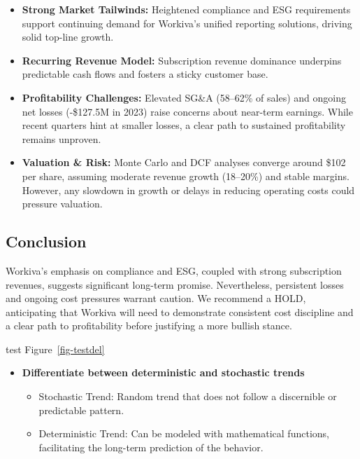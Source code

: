 \documentclass[
  10pt,
  a4paper,
]{article}
\providecommand{\tightlist}{%
  \setlength{\itemsep}{0pt}\setlength{\parskip}{0pt}}\usepackage{longtable,booktabs,array}
\begin{document}
\begin{itemize}
\tightlist
\item
  \textbf{Strong Market Tailwinds:} Heightened compliance and ESG
  requirements support continuing demand for Workiva's unified reporting
  solutions, driving solid top-line growth.
\item
  \textbf{Recurring Revenue Model:} Subscription revenue dominance
  underpins predictable cash flows and fosters a sticky customer base.
\item
  \textbf{Profitability Challenges:} Elevated SG\&A (58--62\% of sales)
  and ongoing net losses (-\$127.5M in 2023) raise concerns about
  near-term earnings. While recent quarters hint at smaller losses, a
  clear path to sustained profitability remains unproven.
\item
  \textbf{Valuation \& Risk:} Monte Carlo and DCF analyses converge
  around \$102 per share, assuming moderate revenue growth (18--20\%)
  and stable margins. However, any slowdown in growth or delays in
  reducing operating costs could pressure valuation.
\end{itemize}

\subsection{Conclusion}\label{conclusion-1}

Workiva's emphasis on compliance and ESG, coupled with strong
subscription revenues, suggests significant long-term promise.
Nevertheless, persistent losses and ongoing cost pressures warrant
caution. We recommend a HOLD, anticipating that Workiva will need to
demonstrate consistent cost discipline and a clear path to profitability
before justifying a more bullish stance.

test Figure~\ref{fig-testdel}

\begin{itemize}
\tightlist
\item
  \textbf{Differentiate between deterministic and stochastic trends}

  \begin{itemize}
  \tightlist
  \item
    Stochastic Trend: Random trend that does not follow a discernible or
    predictable pattern.
  \item
    Deterministic Trend: Can be modeled with mathematical functions,
    facilitating the long-term prediction of the behavior.
  \end{itemize}
\end{itemize}
\end{document}
